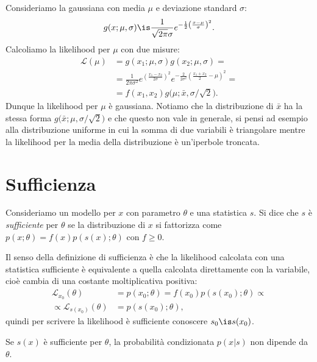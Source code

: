 Consideriamo la gaussiana con media $\mu$ e deviazione standard $\sigma$:
\begin{equation*}
	g(x;\mu,\sigma) \is \frac1{\sqrt{2\pi}\sigma} e^{-\frac12 \left( \frac{x-\mu}\sigma \right)^2}.
\end{equation*}
Calcoliamo la likelihood per $\mu$ con due misure:
\begin{align*}
	\mathcal L(\mu)
	&= g(x_1;\mu,\sigma) g(x_2;\mu,\sigma) = \\
	&= \frac1{2\pi\sigma^2}
	e^{\left( \frac{x_1-x_2}{2\sigma} \right)^2}
	e^{-\frac2{2\sigma^2} \left( \frac{x_1+x_2}2 - \mu \right)^2} = \\
	&= f(x_1,x_2) g \big( \mu;\bar x,\sigma/\sqrt2 \big).
\end{align*}
Dunque la likelihood per $\mu$ è gaussiana.
Notiamo che la distribuzione di $\bar x$ ha la stessa forma $g \big( \bar x;\mu,\sigma/\sqrt2 \big)$
e che questo non vale in generale, si pensi ad esempio alla distribuzione uniforme
in cui la somma di due variabili è triangolare mentre la likelihood per la media della distribuzione è un'iperbole troncata.

\section{Sufficienza}

\begin{definition}[Sufficienza]
	\label{th:suff}
	Consideriamo un modello per $x$ con parametro $\theta$ e una statistica $s$.
	Si dice che $s$ è \emph{sufficiente} per $\theta$ se la distribuzione di $x$ si fattorizza come
	$p(x;\theta) = f(x) p(s(x);\theta)$ con $f\ge0$.
\end{definition}

Il senso della definizione di sufficienza
è che la likelihood calcolata con una statistica sufficiente
è equivalente a quella calcolata direttamente con la variabile,
cioè cambia di una costante moltiplicativa positiva:
\begin{align*}
	\mathcal L_{x_0}(\theta)
	&= p(x_0;\theta) = f(x_0) p(s(x_0);\theta) \propto \\
	\propto \mathcal L_{s(x_0)}(\theta)
	&= p(s(x_0);\theta),
\end{align*}
quindi per scrivere la likelihood è sufficiente conoscere $s_0 \is s(x_0)$.

\begin{theorem}
	Se $s(x)$ è sufficiente per $\theta$,
	la probabilità condizionata $p(x|s)$ non dipende da $\theta$.
\end{theorem}

